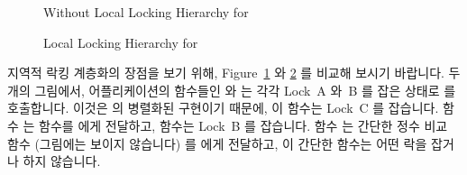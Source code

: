 \begin{figure}[tb]
\centering
{}
\caption{Without Local Locking Hierarchy for }
\label{fig:lock:Without Local Locking Hierarchy for qsort()}
\end{figure}

\begin{figure}[tb]
\centering
{}
\caption{Local Locking Hierarchy for }
\label{fig:lock:Local Locking Hierarchy for qsort()}
\end{figure}

지역적 락킹 계층화의 장점을 보기 위해,
Figure~\ref{fig:lock:Without Local Locking Hierarchy for qsort()} 와
\ref{fig:lock:Local Locking Hierarchy for qsort()} 를 비교해 보시기 바랍니다.
두개의 그림에서, 어플리케이션의 함수들인  와  는 각각
Lock~A 와~B 를 잡은 상태로  를 호출합니다.
이것은  의 병렬화된 구현이기 때문에, 이 함수는 Lock~C 를 잡습니다.
함수  는  함수를  에게 전달하고, 
함수는 Lock~B 를 잡습니다.
함수  는 간단한 정수 비교 함수 (그림에는 보이지 않습니다) 를
 에게 전달하고, 이 간단한 함수는 어떤 락을 잡거나 하지 않습니다.
\iffalse

